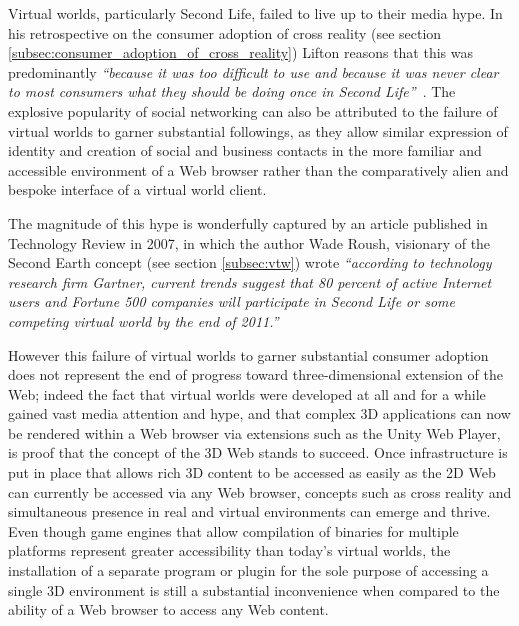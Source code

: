 Virtual worlds, particularly Second Life, failed to live up to their media hype. In his retrospective on the consumer adoption of cross reality (see section \ref{subsec:consumer_adoption_of_cross_reality}) Lifton reasons that this was predominantly \textit{``because it was too difficult to use and because it was never clear to most consumers what they should be doing once in Second Life''}~\cite{lifton:adoption}. The explosive popularity of social networking can also be attributed to the failure of virtual worlds to garner substantial followings, as they allow similar expression of identity and creation of social and business contacts in the more familiar and accessible environment of a Web browser rather than the comparatively alien and bespoke interface of a virtual world client.

The magnitude of this hype is wonderfully captured by an article published in Technology Review in 2007, in which the author Wade Roush, visionary of the Second Earth concept (see section \ref{subsec:vtw}) wrote \textit{``according to technology research firm Gartner, current trends suggest that 80 percent of active Internet users and Fortune 500 companies will participate in Second Life or some competing virtual world by the end of 2011.''}

However this failure of virtual worlds to garner substantial consumer adoption does not represent the end of progress toward three-dimensional extension of the Web; indeed the fact that virtual worlds were developed at all and for a while gained vast media attention and hype, and that complex 3D applications can now be rendered within a Web browser via extensions such as the Unity Web Player, is proof that the concept of the 3D Web stands to succeed. Once infrastructure is put in place that allows rich 3D content to be accessed as easily as the 2D Web can currently be accessed via any Web browser, concepts such as cross reality and simultaneous presence in real and virtual environments can emerge and thrive. Even though game engines that allow compilation of binaries for multiple platforms represent greater accessibility than today's virtual worlds, the installation of a separate program or plugin for the sole purpose of accessing a single 3D environment is still a substantial inconvenience when compared to the ability of a Web browser to access any Web content.

